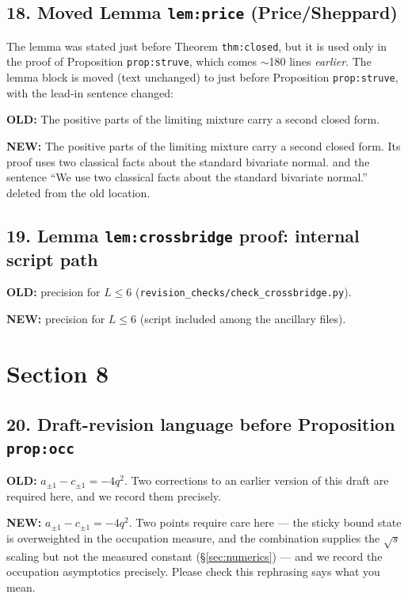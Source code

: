 \documentclass[11pt]{article}
\newenvironment{old}{\par\noindent\textcolor{oldred}{\textbf{OLD:}}\small\color{oldred}\verbatim}{\endverbatim\normalsize\color{black}}
\newenvironment{new}{\par\noindent\textcolor{newgreen}{\textbf{NEW:}}\small\color{newgreen}\verbatim}{\endverbatim\normalsize\color{black}}
\begin{document}
\subsection*{18. Moved Lemma \texttt{lem:price} (Price/Sheppard)}
The lemma was stated just before Theorem \texttt{thm:closed}, but it is used
only in the proof of Proposition \texttt{prop:struve}, which comes
$\sim$180 lines \emph{earlier}. The lemma block is moved (text unchanged) to
just before Proposition \texttt{prop:struve}, with the lead-in sentence changed:
\begin{old}
The positive parts of the limiting mixture carry a second closed form.
\end{old}
\begin{new}
The positive parts of the limiting mixture carry a second closed form. Its proof
uses two classical facts about the standard bivariate normal.
\end{new}
and the sentence ``We use two classical facts about the standard bivariate
normal.'' deleted from the old location.

\subsection*{19. Lemma \texttt{lem:crossbridge} proof: internal script path}
\begin{old}
precision for $L\le6$ (\texttt{revision\_checks/check\_crossbridge.py}).
\end{old}
\begin{new}
precision for $L\le6$ (script included among the ancillary files).
\end{new}

\section*{Section 8}

\subsection*{20. Draft-revision language before Proposition \texttt{prop:occ}}
\begin{old}
$a_{\pm1}-c_{\pm1}=-4q^2$. Two corrections to an earlier version of this draft are
required here, and we record them precisely.
\end{old}
\begin{new}
$a_{\pm1}-c_{\pm1}=-4q^2$. Two points require care here --- the sticky bound state is
overweighted in the occupation measure, and the combination supplies the $\sqrt s$
scaling but not the measured constant (\S\ref{sec:numerics}) --- and we record the
occupation asymptotics precisely.
\end{new}
Please check this rephrasing says what you mean.
\end{document}
